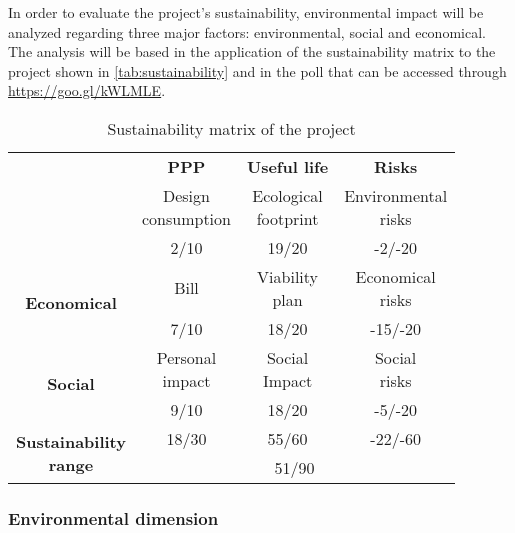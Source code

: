 In order to evaluate the project's sustainability, environmental impact will be analyzed
regarding three major factors: environmental, social and economical. The analysis will be 
based in the application of the sustainability matrix to the project shown in
\autoref{tab:sustainability} and in the poll that can be accessed through 
\url{https://goo.gl/kWLMLE}.

\begin{table}[H]
  \centering
  \begin{tabular}{|c|c|c|c|}
    \cline{2-4}
    \multicolumn{1}{c|}{} & \textbf{PPP} & \textbf{Useful life} & \textbf{Risks} \\ 
    \hhline{-===}

    \multirow[c]{2}{*}{\textbf{Environmental}} & 
    \makecell{Design \\ consumption} & \makecell{Ecological \\ footprint} & 
    \makecell{Environmental \\ risks} \\ \cline{2-4}
    & 2/10 & 19/20 & -2/-20 \\ \hline
    
    \multirow{2}{*}{\textbf{Economical}} & 
    Bill & \makecell{Viability \\ plan} & \makecell{Economical \\ risks} \\ \cline{2-4}
    & 7/10 & 18/20 & -15/-20 \\ \hline

    \multirow{2}{*}{\textbf{Social}} &
    \makecell{Personal \\ impact} & \makecell{Social \\ Impact} & 
    \makecell{Social \\ risks} \\ \cline{2-4} 
    & 9/10 & 18/20 & -5/-20 \\ \hline

    \hline\hline
    \multirow{2}{*}{\parbox[c]{3cm}{\centering\textbf{Sustainability \\ range}}} &
    18/30 & 55/60 & -22/-60 \\ \cline{2-4}
    & \multicolumn{3}{c|}{51/90} \\ \hline

  \end{tabular}
  \caption{Sustainability matrix of the project \label{tab:sustainability}}
\end{table}

\subsubsection{Environmental dimension}

